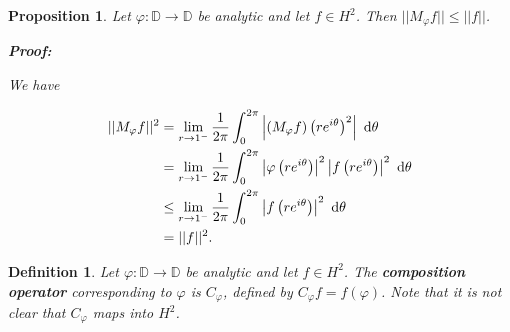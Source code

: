 \documentclass{article}
\theoremstyle{colontheorem}
\newtheorem{proposition}[theorem]{Proposition}
\newtheorem{definition}[theorem]{Definition}
\newenvironment{Proposition}
{
	\begin{mdframed}[backgroundcolor=TheoremOrange!10]
	\begin{proposition}
}
{
	\end{proposition}
	\end{mdframed}
	
	\vspace{.15in}
}
\newenvironment{Def}
{
	\begin{mdframed}[backgroundcolor=DefGreen!10]
	\begin{definition}
}
{
	\end{definition}
	\end{mdframed}
	
	\vspace{.15in}
}
\newenvironment{Proof}
{
	\begin{mdframed}[backgroundcolor=ProofPurple!10]
	\textbf{Proof:}%
}
{
	\end{mdframed}
	
	\vspace{.085in}
}
\begin{document}
\begin{Proposition}
	
	Let $\varphi : \mathbb{D} \longrightarrow \mathbb{D}$ be analytic and let $f \in H^2$. Then $||M_\varphi f|| \leq ||f||$.
	
	\begin{Proof}
		We have
		
		\begin{align*}
			||M_\varphi f||^2 &= \lim\limits_{r \to 1^-} \frac{1}{2 \pi} \int_0^{2\pi} \left| (M_\varphi f) \left(re^{i \theta} \right)^2 \right|\ \textnormal{d}\theta\\
			&= \lim\limits_{r \to 1^-} \frac{1}{2 \pi} \int_0^{2\pi} \left| \varphi \left(re^{i \theta} \right) \right|^2 \left| f \left(re^{i \theta} \right) \right|^2\ \textnormal{d}\theta\\
			&\leq \lim\limits_{r \to 1^-} \frac{1}{2 \pi} \int_0^{2\pi} \left| f \left(re^{i \theta} \right) \right|^2\ \textnormal{d}\theta\\
			&= ||f||^2.
		\end{align*}
		
	\end{Proof}
	
\end{Proposition}



\begin{Def}
	
	Let $\varphi : \mathbb{D} \longrightarrow \mathbb{D}$ be analytic and let $f \in H^2$. The \textbf{composition operator} corresponding to $\varphi$ is $C_\varphi$, defined by $C_\varphi f = f(\varphi)$. Note that it is not clear that $C_\varphi$ maps into $H^2$.
	
\end{Def}
\end{document}
